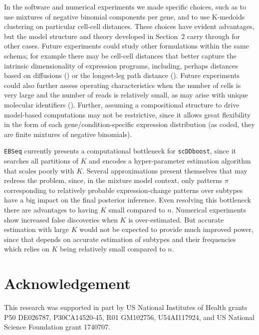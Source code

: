 \documentclass[aoas,preprint]{imsart}
\begin{document}
In the software and numerical experiments we made specific choices,
 such as to use mixtures of negative binomial components per gene, and to use K-medoids
clustering on particular cell-cell distances.   These choices have evident advantages, but the 
model structure and theory developed in Section~2 carry through for other cases. Future experiments
could study other formulations within the same schema; for example there may be cell-cell 
distances that better capture the intrinsic dimensionality of expression programs, including, perhaps
distances based on diffusions (\cite{Haghverdi:2015aa}) or  
the longest-leg path distance (\cite{Little2017PathBasedSC}).
Future experiments could also further assess operating characteristics when the number of cells is very large 
and the number of reads is relatively small, as may arise with unique molecular identifiers (\cite{Chen:2018aa}).
Further, assuming a compositional structure to drive model-based computations may not be restrictive,
since it allows great flexibility in the form of each gene/condition-specific expression distribution
(as coded, they are finite mixtures of negative binomials).

   
\verb+EBSeq+ currently presents a computational bottleneck for \verb+scDDboost+, since it
searches all partitions of $K$ and encodes a hyper-parameter estimation algorithm that scales poorly with $K$.
Several approximations present themselves that may redress the problem, since,
in the mixture model context, only patterns $\pi$ corresponding to relatively probable expression-change
patterns over subtypes have a big impact on the final posterior inference.   Even resolving this
bottleneck there are advantages to having $K$ small compared to $n$.  Numerical experiments 
show increased false discoveries when $K$ is over-estimated.  But accurate estimation with large $K$ would
not be expected to provide much improved power, since that depends on accurate estimation of subtypes and their
frequencies which relies on $K$ being relatively small compared to $n$.




\section*{Acknowledgement}
This research was supported in part by US National Institutes of Health grants 
P50 DE026787, P30CA14520-45, R01 GM102756, U54AI117924, 
and US  National Science Foundation grant 1740707.

%


\end{document}
